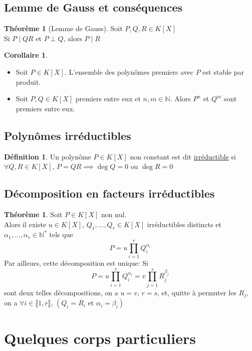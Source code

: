 \documentclass[10pt,a4paper]{article}
\theoremstyle{definition}
\newtheorem{theorem}[proposition]{Théorème}
\newtheorem{corollaire}[proposition]{Corollaire}
\newtheorem{definition}[proposition]{Définition}
\begin{document}
\subsection{Lemme de Gauss et conséquences}
\begin{theorem}[Lemme de Gauss]
Soit $P, Q, R \in K[X]$ \\
Si $P \mid QR$ et $P \perp Q$, alors $P \mid R$
\end{theorem}
\begin{corollaire}
\hfill
\begin{itemize}
\item Soit $P \in K[X]$. L'ensemble des polynômes premiers avec $P$ est stable par produit.
\item Soit $P, Q \in K[X]$ premiers entre eux et $n, m \in \mathbb{N}$. Alors $P^n$ et $Q^m$ sont premiers entre eux.
\end{itemize}
\end{corollaire}

\subsection{Polynômes irréductibles}
\begin{definition}
Un polynôme $P \in K[X]$ non constant est dit \uline{irréductible} si \\
$\forall Q, R \in K[X]$, $P = QR \implies \deg{Q} = 0$ ou $\deg{R} = 0$
\end{definition}

\subsection{Décomposition en facteurs irréductibles}
\begin{theorem}
Soit $P \in K[X]$ non nul. \\
Alors il existe $u \in K[X]$, $Q_1, ... , Q_r \in K[X]$ irréductibles distincts et $\alpha_1, ... , \alpha_r \in \mathbb{N}^*$ tels que
\[P = u \prod\limits_{i = 1}^{r} Q_i^{\alpha_i}\]
Par ailleurs, cette décomposition est unique: Si
\[P = u \prod\limits_{i = 1}^{r} Q_i^{\alpha_i} = v \prod\limits_{j = 1}^{s} R_j^{\beta_j}\] sont deux telles décompositions, on a $u = v$, $r = s$, et, quitte à permuter les $R_j$, \\
on a $\forall i \in \llbracket 1, r \rrbracket$, $(Q_i = R_i \text{ et } \alpha_i = \beta_i)$
\end{theorem}

\section{Quelques corps particuliers}
\end{document}
